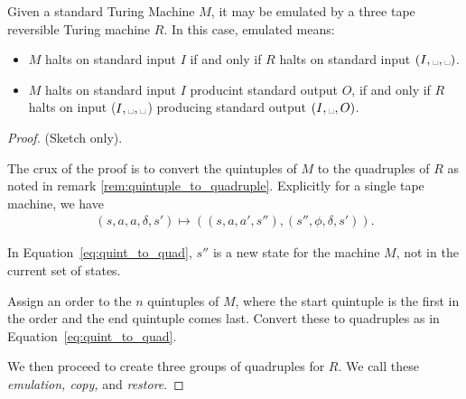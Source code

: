 \begin{theorem}\label{thm:reversible_turing_machine_emulates_standard}
  Given a standard Turing Machine $M$, it may be emulated by a three tape reversible
  Turing machine $R$. In this case, emulated means:
  \begin{itemize}
    \item $M$ halts on standard input $I$ if and only if $R$ halts on standard input $(I,\blank,\blank)$.
    \item $M$ halts on standard input $I$ producint standard output $O$,
      if and only if $R$ halts on input ($I,\blank,\blank$) producing standard output $(I,\blank,O)$.
  \end{itemize}
\end{theorem}
\begin{proof}
  (Sketch only).

  The crux of the proof is to convert the quintuples of $M$ to the quadruples of
  $R$ as noted in remark \vref{rem:quintuple_to_quadruple}. Explicitly for a single
	tape machine, we have
  \begin{align}
    (s,a,a,\delta,s') \mapsto \left((s,a,a',s''),
          (s'',\phi,\delta,s')\right).\label{eq:quint_to_quad}
  \end{align}
	
	In Equation~\eqref{eq:quint_to_quad}, $s''$ is a new state for the machine $M$, 
	not in the current set of states.

  Assign an order to the $n$ quintuples of $M$, where the start
  quintuple is the first in the order and the end quintuple comes last. Convert these to
	quadruples as in Equation~\eqref{eq:quint_to_quad}. 
	
	We then proceed to create three groups of quadruples for $R$.
  We call these \emph{emulation, copy,} and \emph{restore}.


\end{proof}
